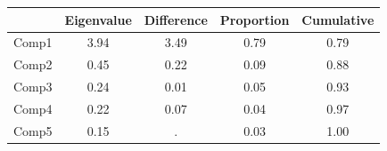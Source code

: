 {
\def\sym#1{\ifmmode^{#1}\else\(^{#1}\)\fi}
\begin{tabular}{l*{1}{cccc}}
\toprule
            &  Eigenvalue&  Difference&  Proportion&  Cumulative\\
\midrule
Comp1       &        3.94&        3.49&        0.79&        0.79\\
Comp2       &        0.45&        0.22&        0.09&        0.88\\
Comp3       &        0.24&        0.01&        0.05&        0.93\\
Comp4       &        0.22&        0.07&        0.04&        0.97\\
Comp5       &        0.15&           .&        0.03&        1.00\\
\bottomrule
\end{tabular}
}
